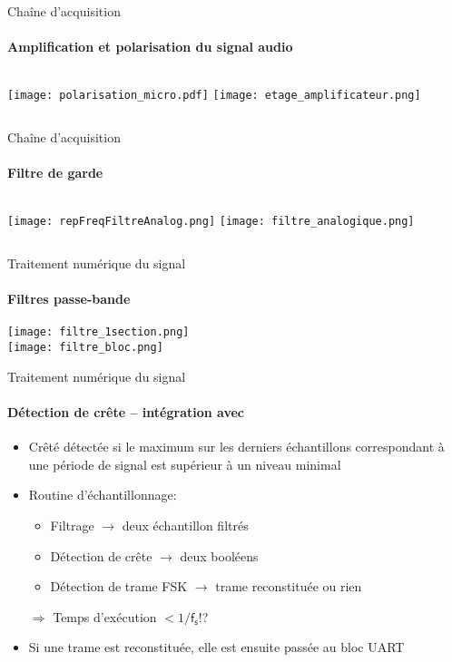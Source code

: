 \begin{frame}
  \tableofcontents[currentsection]
\end{frame}

\begin{frame}{Chaîne d'acquisition}
  \framesubtitle{Amplification et polarisation du signal audio}
  \begin{columns}[c]
  \vspace{4.5cm}
  \texttt{[image: polarisation\_micro.pdf]}
  \texttt{[image: etage\_amplificateur.png]}
  \end{columns}
\end{frame}

\begin{frame}{Chaîne d'acquisition}
  \framesubtitle{Filtre de garde}
  \begin{columns}[c]
  \texttt{[image: repFreqFiltreAnalog.png]}
  \texttt{[image: filtre\_analogique.png]}
  \end{columns}
\end{frame}

\begin{frame}{Traitement numérique du signal}
  \framesubtitle{Filtres passe-bande}
  \begin{center}
  \texttt{[image: filtre\_1section.png]}\\
  \texttt{[image: filtre\_bloc.png]}
  \end{center}
\end{frame}

\begin{frame}{Traitement numérique du signal}
  \framesubtitle{Détection de crête -- intégration avec }
  \begin{itemize}
    \item Crêté détectée si le maximum sur les derniers échantillons correspondant à une période de signal est supérieur à un niveau minimal
    \item Routine d'échantillonnage:
    \begin{itemize}
      \item Filtrage $\rightarrow$ deux échantillon filtrés
      \item Détection de crête $\rightarrow$ deux booléens
      \item Détection de trame FSK $\rightarrow$ trame reconstituée ou rien
    \end{itemize}
    {\large $\Rightarrow$ Temps d'exécution $<1/\mathsf{f_s}$!?}
    \item Si une trame est reconstituée, elle est ensuite passée au bloc UART
  \end{itemize}
\end{frame}



